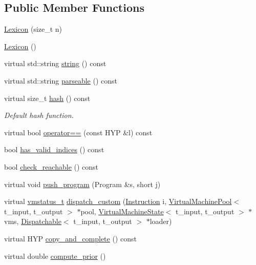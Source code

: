 \subsection*{Public Member Functions}
\begin{DoxyCompactItemize}
\item 
\hyperlink{class_lexicon_a8dde249de3f884484ff14de62a2c6df2}{Lexicon} (size\+\_\+t n)
\item 
\hyperlink{class_lexicon_a1b81e27f60f3e1cb7c0b376ac66aff45}{Lexicon} ()
\item 
virtual std\+::string \hyperlink{class_lexicon_a25895445cc5f7337e299e8d9dd14822c}{string} () const
\item 
virtual std\+::string \hyperlink{class_lexicon_a8eda74c4e7500b31a382c182ac60436a}{parseable} () const
\item 
virtual size\+\_\+t \hyperlink{class_lexicon_a4fed68bd543c0be81dfd63a2c8d219bd}{hash} () const
\begin{DoxyCompactList}\small\item\em Default hash function. \end{DoxyCompactList}\item 
virtual bool \hyperlink{class_lexicon_a852faeedb6cd12e629e601ebcad41729}{operator==} (const H\+YP \&l) const
\item 
bool \hyperlink{class_lexicon_a6d6b1b025ca707815a6776c3898503e4}{has\+\_\+valid\+\_\+indices} () const
\item 
bool \hyperlink{class_lexicon_aeb3e5f9f75e43f2147a22dee67fc8527}{check\+\_\+reachable} () const
\item 
virtual void \hyperlink{class_lexicon_af85ffc6944b66e92f760aaf7e3521d23}{push\+\_\+program} (Program \&s, short j)
\item 
virtual \hyperlink{_instruction_8h_a6202215407ab29590bb936ca2996cf64}{vmstatus\+\_\+t} \hyperlink{class_lexicon_a1c6b61ac505114f23441e3097163685b}{dispatch\+\_\+custom} (\hyperlink{class_instruction}{Instruction} i, \hyperlink{class_virtual_machine_pool}{Virtual\+Machine\+Pool}$<$ t\+\_\+input, t\+\_\+output $>$ $\ast$pool, \hyperlink{class_virtual_machine_state}{Virtual\+Machine\+State}$<$ t\+\_\+input, t\+\_\+output $>$ $\ast$vms, \hyperlink{class_dispatchable}{Dispatchable}$<$ t\+\_\+input, t\+\_\+output $>$ $\ast$loader)
\item 
virtual H\+YP \hyperlink{class_lexicon_a52a6e819264e04584320adca868aec4a}{copy\+\_\+and\+\_\+complete} () const
\item 
virtual double \hyperlink{class_lexicon_a1ac27e460a361cc90566b92365909324}{compute\+\_\+prior} ()

\end{DoxyCompactItemize}

